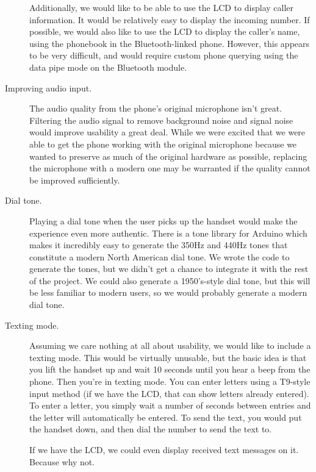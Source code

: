 \documentclass{es50report}
\begin{document}
\begin{description}
                Additionally, we would like to be able to use the LCD to display caller information. It would be relatively easy to display the incoming number. If possible, we would also like to use the LCD to display the caller's name, using the phonebook in the Bluetooth-linked phone. However, this appears to be very difficult, and would require custom phone querying using the data pipe mode on the Bluetooth module.
            \item[Improving audio input.]
                The audio quality from the phone's original microphone isn't great. Filtering the audio signal to remove background noise and signal noise would improve usability a great deal. While we were excited that we were able to get the phone working with the original microphone because we wanted to preserve as much of the original hardware as possible, replacing the microphone with a modern one may be warranted if the quality cannot be improved sufficiently.
            \item[Dial tone.]
                Playing a dial tone when the user picks up the handset would make the experience even more authentic. There is a tone library for Arduino which makes it incredibly easy to generate the 350Hz and 440Hz tones that constitute a modern North American dial tone. We wrote the code to generate the tones, but we didn't get a chance to integrate it with the rest of the project. We could also generate a 1950's-style dial tone, but this will be less familiar to modern users, so we would probably generate a modern dial tone.
            \item[Texting mode.]
                Assuming we care nothing at all about usability, we would like to include a texting mode. This would be virtually unusable, but the basic idea is that you lift the handset up and wait 10 seconds until you hear a beep from the phone. Then you're in texting mode. You can enter letters using a T9-style input method (if we have the LCD, that can show letters already entered). To enter a letter, you simply wait a number of seconds between entries and the letter will automatically be entered. To send the text, you would put the handset down, and then dial the number to send the text to.

                If we have the LCD, we could even display received text messages on it. Because why not.
        \end{description}
\end{document}
